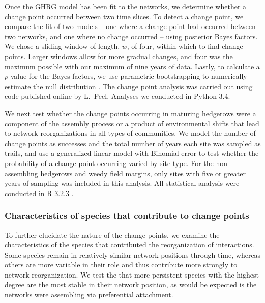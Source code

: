 \documentclass[12pt]{article}
\begin{document}
Once the GHRG model has been fit to the networks, we determine whether
a change point occurred between two time slices. To detect a change
point, we compare the fit of two models -- one where a change point
had occurred between two networks, and one where no change occurred --
using posterior Bayes factors. We chose a sliding window of length,
$w$, of four, within which to find change points. Larger windows allow
for more gradual changes, and four was the maximum possible with our
maximum of nine years of data. Lastly, to calculate a $p$-value for
the Bayes factors, we use parametric bootstrapping to numerically
estimate the null distribution \citep{peel2014detecting}. The change
point analysis was carried out using code published online by
L.~Peel. Analyses we conducted in Python 3.4.

We next test whether the change points occurring in maturing hedgerows
were a component of the assembly process or a product of environmental
shifts that lead to network reorganizations in all types of
communities. We model the number of change points as successes and the
total number of years each site was sampled as trails, and use a
generalized linear model with Binomial error to test whether the
probability of a change point occurring varied by site type. For the
non-assembling hedgerows and weedy field margins, only sites with five
or greater years of sampling was included in this analysis. All
statistical analysis were conducted in R 3.2.3 \citep{R}.

\subsubsection*{Characteristics of species that contribute to change
  points}

To further elucidate the nature of the change points, we examine the
characteristics of the species that contributed the reorganization of
interactions. Some species remain in relatively similar network
positions through time, whereas others are more variable in their role
and thus contribute more strongly to network reorganization. We test
the that more persistent species with the highest degree are the most
stable in their network position, as would be expected is the networks
were assembling via preferential attachment.
\end{document}
